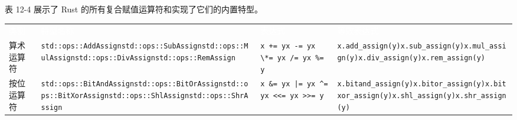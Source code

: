 表 12-4 展示了 Rust 的所有复合赋值运算符和实现了它们的内置特型。


\myTableBegin
\begin{tabularx}{\textwidth}{@{}>{\hsize=0.303\hsize\raggedright\arraybackslash}X>{\hsize=1.232\hsize\raggedright\arraybackslash}X>{\hsize=1.232\hsize\raggedright\arraybackslash}X>{\hsize=1.232\hsize\raggedright\arraybackslash}X@{}}
\rowcolor{tabhead}\textcolor{white}{类别} & \textcolor{white}{特型名称} & \textcolor{white}{表达式} & \textcolor{white}{等效表达式} \\
算术运算符 & \texttt{std::ops::AddAssign}\newline{}\texttt{std::ops::SubAssign}\newline{}\texttt{std::ops::MulAssign}\newline{}\texttt{std::ops::DivAssign}\newline{}\texttt{std::ops::RemAssign} & \texttt{x += y}\newline{}\texttt{x -= y}\newline{}\texttt{x \textbackslash{}*= y}\newline{}\texttt{x /= y}\newline{}\texttt{x \%= y} & \texttt{x.add\_assign(y)}\newline{}\texttt{x.sub\_assign(y)}\newline{}\texttt{x.mul\_assign(y)}\newline{}\texttt{x.div\_assign(y)}\newline{}\texttt{x.rem\_assign(y)} \\
按位运算符 & \texttt{std::ops::BitAndAssign}\newline{}\texttt{std::ops::BitOrAssign}\newline{}\texttt{std::ops::BitXorAssign}\newline{}\texttt{std::ops::ShlAssign}\newline{}\texttt{std::ops::ShrAssign} & \texttt{x \&= y}\newline{}\texttt{x |= y}\newline{}\texttt{x \textasciicircum{}= y}\newline{}\texttt{x <<= y}\newline{}\texttt{x >>= y} & \texttt{x.bitand\_assign(y)}\newline{}\texttt{x.bitor\_assign(y)}\newline{}\texttt{x.bitxor\_assign(y)}\newline{}\texttt{x.shl\_assign(y)}\newline{}\texttt{x.shr\_assign(y)} \\
\end{tabularx}
\myTableEnd

